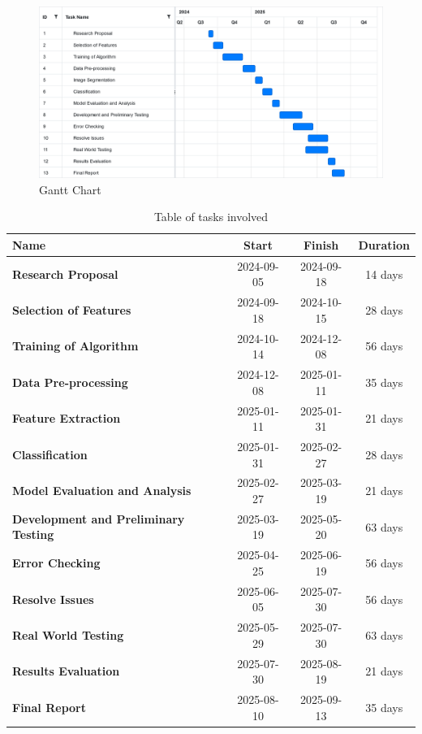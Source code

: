 \documentclass[a4paper, 12pt]{article}
\begin{document}
\begin{figure}[!ht]
    \centering
    \includegraphics[width=1\linewidth]{gantt.png}
    \caption{Gantt Chart}
    \label{gantt:1}
\end{figure}

\begin{table}[!ht]
    \centering
    \begin{tabular}{|l|c|c|c|}
    \hline
        \textbf{Name} & \textbf{Start} & \textbf{Finish} & \textbf{Duration} \\ \hline
        \textbf{Research Proposal} & 2024-09-05 & 2024-09-18 & 14 days \\ \hline
        \textbf{Selection of Features } & 2024-09-18 & 2024-10-15 & 28 days \\ \hline
        \textbf{Training of Algorithm} & 2024-10-14 & 2024-12-08 & 56 days \\ \hline
        \textbf{Data Pre-processing} & 2024-12-08 & 2025-01-11 & 35 days \\ \hline
        \textbf{Feature Extraction} & 2025-01-11 & 2025-01-31 & 21 days \\ \hline
        \textbf{Classification} & 2025-01-31 & 2025-02-27 & 28 days \\ \hline
        \textbf{Model Evaluation and Analysis} & 2025-02-27 & 2025-03-19 & 21 days \\ \hline
        \textbf{Development and Preliminary Testing} & 2025-03-19 & 2025-05-20 & 63 days \\ \hline
        \textbf{Error Checking} & 2025-04-25 & 2025-06-19 & 56 days \\ \hline
        \textbf{Resolve Issues} & 2025-06-05 & 2025-07-30 & 56 days \\ \hline
        \textbf{Real World Testing} & 2025-05-29 & 2025-07-30 & 63 days \\ \hline
        \textbf{Results Evaluation} & 2025-07-30 & 2025-08-19 & 21 days \\ \hline
        \textbf{Final Report} & 2025-08-10 & 2025-09-13 & 35 days \\ \hline
    \end{tabular}
    \caption{Table of tasks involved}
    \label{table:1}
\end{table}
\end{document}
